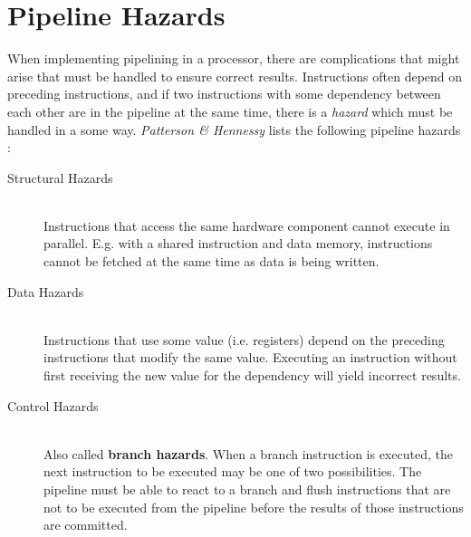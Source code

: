 \section{Pipeline Hazards}
When implementing pipelining in a processor,
there are complications that might arise that must be handled to ensure correct results.
Instructions often depend on preceding instructions,
and if two instructions with some dependency between each other are in the pipeline at the same time,
there is a \textit{hazard} which must be handled in a some way.
\textit{Patterson \& Hennessy} lists the following pipeline hazards
\cite[Chapter 4.5]{bib:patt-henn}:

\begin{description}
\item[Structural Hazards] \hfill \\
    Instructions that access the same hardware component cannot execute in parallel.
    E.g. with a shared instruction and data memory,
    instructions cannot be fetched at the same time as data is being written.
\item[Data Hazards] \hfill \\
    Instructions that use some value (i.e. registers) depend on the preceding instructions that modify the same value.
    Executing an instruction without first receiving the new value for the dependency will yield incorrect results.
\item[Control Hazards] \hfill \\
    Also called \textbf{branch hazards}.
    When a branch instruction is executed,
    the next instruction to be executed may be one of two possibilities.
    The pipeline must be able to react to a branch and flush instructions that are not to be executed from the pipeline before the results of those instructions are committed.
\end{description}
